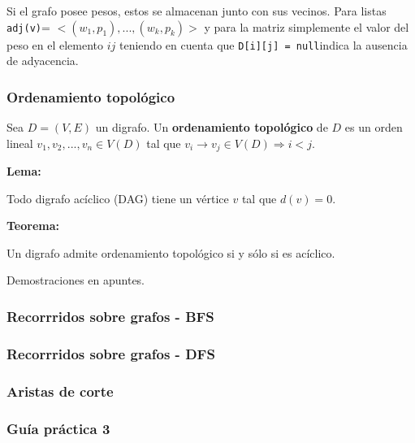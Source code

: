 \documentclass[12pt]{article}
\theoremstyle{definition}
\begin{document}
Si el grafo posee pesos, estos se almacenan junto con sus vecinos. Para listas \lstinline|adj(v)|=
$<(w_1, p_1), ... , (w_k, p_k)>$ y para la matriz simplemente el valor del peso en el elemento $ij$ teniendo
en cuenta que \lstinline|D[i][j] = null|indica la ausencia de adyacencia.

\subsubsection{Ordenamiento topológico}
Sea $D=(V,E)$ un digrafo. Un \textbf{ordenamiento topológico} de $D$ es un orden lineal $v_1, v_2, ..., v_n \in V(D)$
tal que $v_i \rightarrow v_j \in V(D) \Rightarrow i<j$.

\textbf{Lema:}
\begin{center}
    Todo digrafo acíclico (DAG) tiene un vértice $v$ tal que $d(v)=0$.
\end{center}

\textbf{Teorema:}
\begin{center}
    Un digrafo admite ordenamiento topológico si y sólo si es acíclico.
\end{center}

Demostraciones en apuntes.

\subsubsection{Recorrridos sobre grafos - BFS}
\subsubsection{Recorrridos sobre grafos - DFS}
\subsubsection{Aristas de corte}
\subsubsection{Guía práctica 3}
\end{document}
